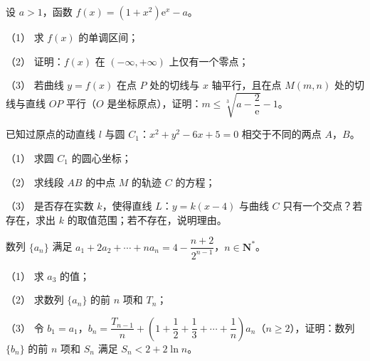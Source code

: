 \begin{question}
设 \(a>1\)，函数 \(f(x)=(1+x^2)\mathrm{e}^x-a\)。

（1） 求 \(f(x)\) 的单调区间；

（2） 证明：\(f(x)\) 在 \((-\infty,+\infty)\) 上仅有一个零点；

（3） 若曲线 \(y=f(x)\) 在点 \(P\) 处的切线与 \(x\) 轴平行，且在点 \(M(m,n)\) 处的切线与直线 \(OP\) 平行（\(O\) 是坐标原点），证明：\(m\leqslant\sqrt[3]{a-\dfrac{2}{\mathrm{e}}}-1\)。

\end{question}
\begin{question}
已知过原点的动直线 \(l\) 与圆 \(C_1\)：\(x^2+y^2-6x+5=0\) 相交于不同的两点 \(A\)，\(B\)。

（1） 求圆 \(C_1\) 的圆心坐标；

（2） 求线段 \(AB\) 的中点 \(M\) 的轨迹 \(C\) 的方程；

（3） 是否存在实数 \(k\)，使得直线 \(L\)：\(y=k(x-4)\) 与曲线 \(C\) 只有一个交点？若存在，求出 \(k\) 的取值范围；若不存在，说明理由。

\end{question}
\begin{question}
数列 \(\{a_n\}\) 满足 \(a_1+2a_2+\cdots+na_n=4-\dfrac{n+2}{2^{n-1}}\)，\(n\in\mathbf{N}^*\)。

（1） 求 \(a_3\) 的值；

（2） 求数列 \(\{a_n\}\) 的前 \(n\) 项和 \(T_n\)；

（3） 令 \(b_1=a_1\)，\(b_n=\dfrac{T_{n-1}}{n}+\left(1+\dfrac{1}{2}+\dfrac{1}{3}+\cdots+\dfrac{1}{n}\right)a_n\)（\(n\geqslant2\)），证明：数列 \(\{b_n\}\) 的前 \(n\) 项和 \(S_n\) 满足 \(S_n<2+2\ln n\)。

\end{question}